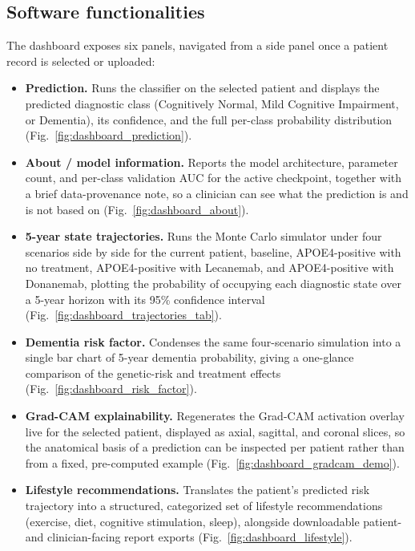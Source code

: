 \documentclass[5p,times,twocolumn]{elsarticle}
\begin{document}
\subsection{Software functionalities}\label{sec2_2}

The dashboard exposes six panels, navigated from a side panel once a patient record is selected or uploaded:

\begin{itemize}
\item \textbf{Prediction.} Runs the classifier on the selected patient and displays the predicted diagnostic class (Cognitively Normal, Mild Cognitive Impairment, or Dementia), its confidence, and the full per-class probability distribution (Fig.~\ref{fig:dashboard_prediction}).
\item \textbf{About / model information.} Reports the model architecture, parameter count, and per-class validation AUC for the active checkpoint, together with a brief data-provenance note, so a clinician can see what the prediction is and is not based on (Fig.~\ref{fig:dashboard_about}).
\item \textbf{5-year state trajectories.} Runs the Monte Carlo simulator under four scenarios side by side for the current patient, baseline, APOE4-positive with no treatment, APOE4-positive with Lecanemab, and APOE4-positive with Donanemab, plotting the probability of occupying each diagnostic state over a 5-year horizon with its 95\% confidence interval (Fig.~\ref{fig:dashboard_trajectories_tab}).
\item \textbf{Dementia risk factor.} Condenses the same four-scenario simulation into a single bar chart of 5-year dementia probability, giving a one-glance comparison of the genetic-risk and treatment effects (Fig.~\ref{fig:dashboard_risk_factor}).
\item \textbf{Grad-CAM explainability.} Regenerates the Grad-CAM activation overlay live for the selected patient, displayed as axial, sagittal, and coronal slices, so the anatomical basis of a prediction can be inspected per patient rather than from a fixed, pre-computed example (Fig.~\ref{fig:dashboard_gradcam_demo}).
\item \textbf{Lifestyle recommendations.} Translates the patient's predicted risk trajectory into a structured, categorized set of lifestyle recommendations (exercise, diet, cognitive stimulation, sleep), alongside downloadable patient- and clinician-facing report exports (Fig.~\ref{fig:dashboard_lifestyle}).
\end{itemize}
\end{document}

